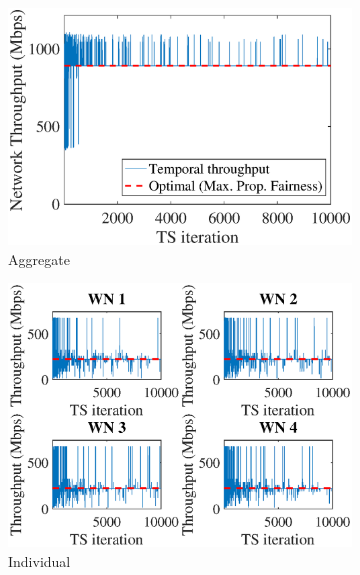 \documentclass[preprint,12pt]{elsarticle}
\begin{document}
\begin{figure}
	\centering
	\begin{subfigure}[b]{.3\textwidth}
		\includegraphics[width=\textwidth]{images/NEW_temporal_aggregate_tpt_TS}
		\caption{Aggregate}\label{fig:ts_agg_tpt}
	\end{subfigure}
	\begin{subfigure}[b]{.3\textwidth}
		\includegraphics[width=\textwidth]{images/NEW_temporal_individual_tpt_TS}
		\caption{Individual}\label{fig:ts_ind_tpt}
	\end{subfigure}
	\begin{subfigure}[b]{.3\textwidth}

\end{subfigure}
\end{figure}
\end{document}
